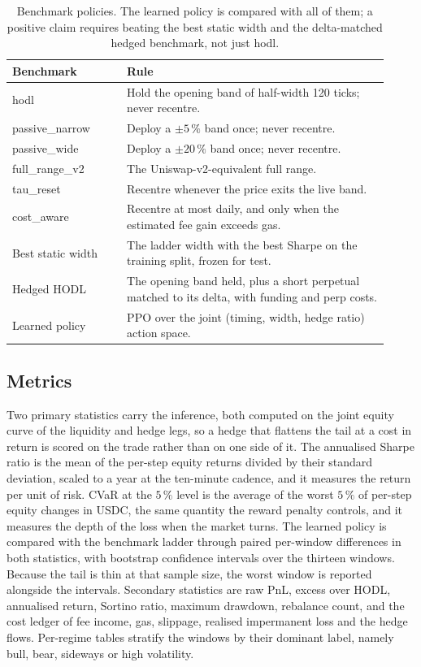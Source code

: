 \begin{table}[tbp]
\caption{Benchmark policies. The learned policy is compared with all of them;
a positive claim requires beating the best static width and the delta-matched
hedged benchmark, not just \textsf{hodl}.}
\label{tab:benchmarks}
\centering
\small
\begin{tabular}{@{}L{0.28\linewidth}L{0.64\linewidth}@{}}
\toprule
\textbf{Benchmark} & \textbf{Rule} \\
\midrule
\textsf{hodl} & Hold the opening band of half-width 120 ticks; never recentre. \\
\textsf{passive\_narrow} & Deploy a $\pm 5\,\%$ band once; never recentre. \\
\textsf{passive\_wide} & Deploy a $\pm 20\,\%$ band once; never recentre. \\
\textsf{full\_range\_v2} & The Uniswap-v2-equivalent full range. \\
\textsf{tau\_reset} & Recentre whenever the price exits the live band. \\
\textsf{cost\_aware} & Recentre at most daily, and only when the estimated fee gain exceeds gas. \\
Best static width & The ladder width with the best Sharpe on the training split, frozen for test. \\
Hedged HODL & The opening band held, plus a short perpetual matched to its delta, with funding and perp costs. \\
Learned policy & PPO over the joint (timing, width, hedge ratio) action space. \\
\bottomrule
\end{tabular}
\end{table}

\subsection{Metrics}

Two primary statistics carry the inference, both computed on the joint equity
curve of the liquidity and hedge legs, so a hedge that flattens the tail at a
cost in return is scored on the trade rather than on one side of it. The
annualised Sharpe ratio is the mean of the per-step equity returns divided by
their standard deviation, scaled to a year at the ten-minute cadence, and it
measures the return per unit of risk. CVaR at the $5\,\%$ level is the average
of the worst $5\,\%$ of per-step equity changes in USDC, the same quantity the
reward penalty controls, and it measures the depth of the loss when the market
turns. The learned policy is compared with the benchmark ladder through paired
per-window differences in both statistics, with bootstrap confidence intervals
over the thirteen windows. Because the tail is thin at that sample size, the
worst window is reported alongside the intervals. Secondary statistics are raw
PnL, excess over HODL, annualised return, Sortino ratio, maximum drawdown,
rebalance count, and the cost ledger of fee income, gas, slippage, realised
impermanent loss and the hedge flows. Per-regime tables stratify the windows
by their dominant label, namely bull, bear, sideways or high volatility.

